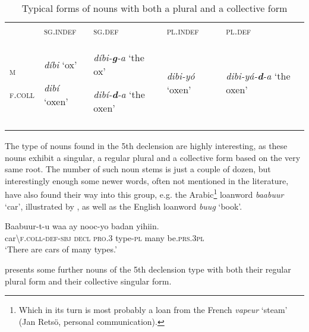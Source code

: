 \documentclass[output=paper]{langsci/langscibook}
\begin{document}
\begin{table}
\caption{Typical forms of nouns with both a plural and a collective form}
\label{tab:9}

\begin{tabularx}{\textwidth}{XXXXX} & {\textsc{sg.indef}} & {\textsc{sg.def}} & {\textsc{pl.indef}} & {\textsc{pl.def}}\\
\lsptoprule
{\textsc{m}}

{\textsc{f.coll}} & {\textit{díbi  }‘ox’}

{\textit{dibí  }‘oxen’} & {\textit{díbi-}\textbf{\textit{g}}\textit{{}-a  }‘the ox’ }

{\textit{dibí-}\textbf{\textit{d}}\textit{{}-a  }‘the oxen’} & {\textit{dibi-yó  }‘oxen’} & {\textit{dibi-yá-}\textbf{\textit{d}}\textit{{}-a  }‘the oxen’}\\
\lspbottomrule
\end{tabularx}

\end{table} 


The type of nouns found in the 5th declension are highly interesting, as these nouns exhibit a singular, a regular plural and a collective form based on the very same root. The number of such noun stems is just a couple of dozen, but interestingly enough some newer words, often not mentioned in the literature, have also found their way into this group, e.g. the Arabic\footnote{Which in its turn is most probably a loan from the French \textit{vapeur} ‘steam’ (Jan Retsö, personal communication).} loanword \textit{baabuur} ‘car’, illustrated by , as well as the English loanword \textit{buug} ‘book’.

\ea
\gll Baabuur-t-u     waa    ay    nooc-yo  badan   yihiin.\\
     car{\textbackslash}\textsc{f.coll-def-sbj  decl    pro.3  }type-\textsc{pl}  many   be.\textsc{prs.3pl}\\
\glt ‘There are cars of many types.’
\z

 presents some further nouns of the 5th declension type with both their regular plural form and their collective singular form.
 
\end{document}
